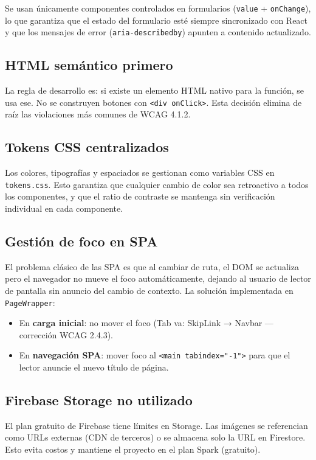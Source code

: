 \documentclass[12pt, a4paper]{article}
\begin{document}
Se usan únicamente componentes controlados en formularios (\texttt{value} + \texttt{onChange}), lo que garantiza que el estado del formulario esté siempre sincronizado con React y que los mensajes de error (\texttt{aria-describedby}) apunten a contenido actualizado.

\subsection{HTML semántico primero}

La regla de desarrollo es: si existe un elemento HTML nativo para la función, se usa ese. No se construyen botones con \texttt{<div onClick>}. Esta decisión elimina de raíz las violaciones más comunes de WCAG 4.1.2.

\subsection{Tokens CSS centralizados}

Los colores, tipografías y espaciados se gestionan como variables CSS en \texttt{tokens.css}. Esto garantiza que cualquier cambio de color sea retroactivo a todos los componentes, y que el ratio de contraste se mantenga sin verificación individual en cada componente.

\subsection{Gestión de foco en SPA}

El problema clásico de las SPA es que al cambiar de ruta, el DOM se actualiza pero el navegador no mueve el foco automáticamente, dejando al usuario de lector de pantalla sin anuncio del cambio de contexto. La solución implementada en \texttt{PageWrapper}:
\begin{itemize}
  \item En \textbf{carga inicial}: no mover el foco (Tab va: SkipLink → Navbar — corrección WCAG 2.4.3).
  \item En \textbf{navegación SPA}: mover foco al \texttt{<main tabindex="-1">} para que el lector anuncie el nuevo título de página.
\end{itemize}

\subsection{Firebase Storage no utilizado}

El plan gratuito de Firebase tiene límites en Storage. Las imágenes se referencian como URLs externas (CDN de terceros) o se almacena solo la URL en Firestore. Esto evita costos y mantiene el proyecto en el plan Spark (gratuito).
\end{document}
